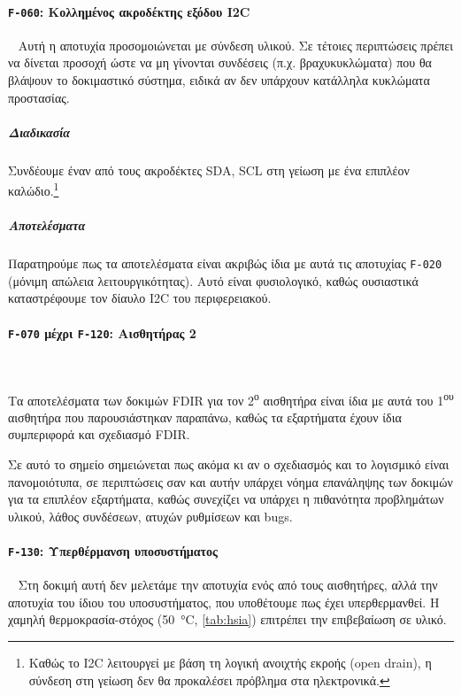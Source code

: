 \documentclass[a4paper,nobib]{tufte-book}
\begin{document}
\FloatBarrier
\paragraph{\textbf{\texttt{F-060}: Κολλημένος ακροδέκτης εξόδου \acs{I2C}}}~
Αυτή η αποτυχία προσομοιώνεται με σύνδεση υλικού. Σε τέτοιες περιπτώσεις πρέπει να δίνεται προσοχή ώστε να μη γίνονται συνδέσεις (π.χ. βραχυκυκλώματα) που θα βλάψουν το δοκιμαστικό σύστημα, ειδικά αν δεν υπάρχουν κατάλληλα κυκλώματα προστασίας.

\subparagraph{Διαδικασία}
\begin{compactenum}
	\item Συνδέουμε έναν από τους ακροδέκτες \acs{SDA}, \acs{SCL} στη γείωση με ένα επιπλέον καλώδιο.\footnote{Καθώς το \acs{I2C} λειτουργεί με βάση τη λογική ανοιχτής εκροής (open drain), η σύνδεση στη γείωση δεν θα προκαλέσει πρόβλημα στα ηλεκτρονικά.}
\end{compactenum}

\subparagraph{Αποτελέσματα}
Παρατηρούμε πως τα αποτελέσματα είναι ακριβώς ίδια με αυτά τις αποτυχίας \texttt{F-020} (μόνιμη απώλεια λειτουργικότητας). Αυτό είναι φυσιολογικό, καθώς ουσιαστικά καταστρέφουμε τον δίαυλο \acs{I2C} του περιφερειακού.

\paragraph{\textbf{\texttt{F-070} μέχρι \texttt{F-120}: Αισθητήρας 2}}~

Τα αποτελέσματα των δοκιμών \acs{FDIR} για τον 2\textsuperscript{ο} αισθητήρα είναι ίδια με αυτά του 1\textsuperscript{ου} αισθητήρα που παρουσιάστηκαν παραπάνω, καθώς τα εξαρτήματα έχουν ίδια συμπεριφορά και σχεδιασμό \acs{FDIR}.

Σε αυτό το σημείο σημειώνεται πως ακόμα κι αν ο σχεδιασμός και το λογισμικό είναι πανομοιότυπα, σε περιπτώσεις σαν και αυτήν υπάρχει νόημα επανάληψης των δοκιμών για τα επιπλέον εξαρτήματα, καθώς συνεχίζει να υπάρχει η πιθανότητα προβλημάτων υλικού, λάθος συνδέσεων, ατυχών ρυθμίσεων και bugs.

\clearpage
\paragraph{\textbf{\texttt{F-130}: Υπερθέρμανση υποσυστήματος}}~
Στη δοκιμή αυτή δεν μελετάμε την αποτυχία ενός από τους αισθητήρες, αλλά την αποτυχία του ίδιου του υποσυστήματος, που υποθέτουμε πως έχει υπερθερμανθεί. Η χαμηλή θερμοκρασία-στόχος (\SI{50}{\celsius}, \cref{tab:hsia}) επιτρέπει την επιβεβαίωση σε υλικό.
\end{document}
